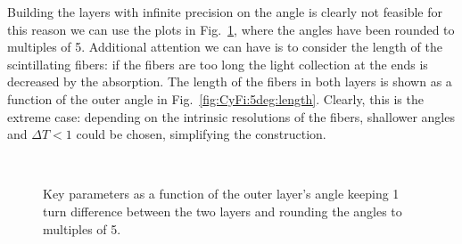 \begin{refsection}
Building the layers with infinite precision on the angle is clearly not feasible for this reason we can use the plots in Fig.~\ref{fig:CyFi:5deg}, where the angles have been rounded to multiples of \SI{5}{\deg}. 
Additional attention we can have is to consider the length of the scintillating fibers: if the fibers are too long the light collection at the ends is decreased by the absorption. The length of the fibers in both layers is shown as a function of the outer angle in Fig.~\ref{fig:CyFi:5deg:length}.
Clearly, this is the extreme case: depending on the intrinsic resolutions of the fibers, shallower angles and $\Delta T<1$ could be chosen, simplifying the construction. 
\begin{figure}[ht]   
\centering
{}
\hfill
{}\\
\caption{Key parameters as a function of the outer layer's angle keeping 1 turn difference between the two layers and rounding the angles to multiples of \SI{5}{\deg}.}
\label{fig:CyFi:5deg}
\end{figure}




\end{refsection}
